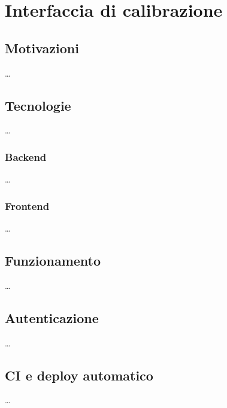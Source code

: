 \chapter{Interfaccia di calibrazione}\label{ch:interfaccia}

\section{Motivazioni}\label{sec:motivazioni}
\ldots

\section{Tecnologie}\label{sec:tecnologie}
\ldots

\subsection{Backend}\label{ssec:interfaccia-backend}
\ldots

\subsection{Frontend}\label{ssec:interfaccia-frontend}
\ldots

\section{Funzionamento}\label{sec:funzionamento}
\ldots

\section{Autenticazione}\label{sec:autenticazione}
\ldots

\section{CI e deploy automatico}\label{sec:ci}
\ldots